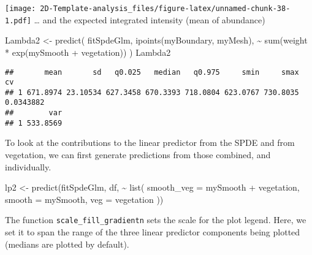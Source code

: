 \documentclass[
]{article}
\newenvironment{Shaded}{\begin{snugshade}}{\end{snugshade}}
\newcommand{\AttributeTok}[1]{\textcolor[rgb]{0.77,0.63,0.00}{#1}}
\newcommand{\FunctionTok}[1]{\textcolor[rgb]{0.00,0.00,0.00}{#1}}
\newcommand{\NormalTok}[1]{#1}
\newcommand{\OtherTok}[1]{\textcolor[rgb]{0.56,0.35,0.01}{#1}}
\newcommand{\SpecialCharTok}[1]{\textcolor[rgb]{0.00,0.00,0.00}{#1}}
\begin{document}
\texttt{[image: 2D-Template-analysis\_files/figure-latex/unnamed-chunk-38-1.pdf]}
\ldots{} and the expected integrated intensity (mean of abundance)

\begin{Shaded}
\begin{Highlighting}[]
\NormalTok{Lambda2 }\OtherTok{\textless{}{-}} \FunctionTok{predict}\NormalTok{(}
\NormalTok{  fitSpdeGlm,}
  \FunctionTok{ipoints}\NormalTok{(myBoundary, myMesh),}
  \SpecialCharTok{\textasciitilde{}} \FunctionTok{sum}\NormalTok{(weight }\SpecialCharTok{*} \FunctionTok{exp}\NormalTok{(mySmooth }\SpecialCharTok{+}\NormalTok{ vegetation))}
\NormalTok{)}
\NormalTok{Lambda2}
\end{Highlighting}
\end{Shaded}

\begin{verbatim}
##       mean       sd   q0.025   median   q0.975     smin     smax        cv
## 1 671.8974 23.10534 627.3458 670.3393 718.0804 623.0767 730.8035 0.0343882
##        var
## 1 533.8569
\end{verbatim}

To look at the contributions to the linear predictor from the SPDE and
from vegetation, we can first generate predictions from those combined,
and individually.

\begin{Shaded}
\begin{Highlighting}[]
\NormalTok{lp2 }\OtherTok{\textless{}{-}} \FunctionTok{predict}\NormalTok{(fitSpdeGlm, df, }\SpecialCharTok{\textasciitilde{}} \FunctionTok{list}\NormalTok{(}
  \AttributeTok{smooth\_veg =}\NormalTok{ mySmooth }\SpecialCharTok{+}\NormalTok{ vegetation,}
  \AttributeTok{smooth =}\NormalTok{ mySmooth,}
  \AttributeTok{veg =}\NormalTok{ vegetation}
\NormalTok{))}
\end{Highlighting}
\end{Shaded}

The function \texttt{scale\_fill\_gradientn} sets the scale for the plot
legend. Here, we set it to span the range of the three linear predictor
components being plotted (medians are plotted by default).
\end{document}
